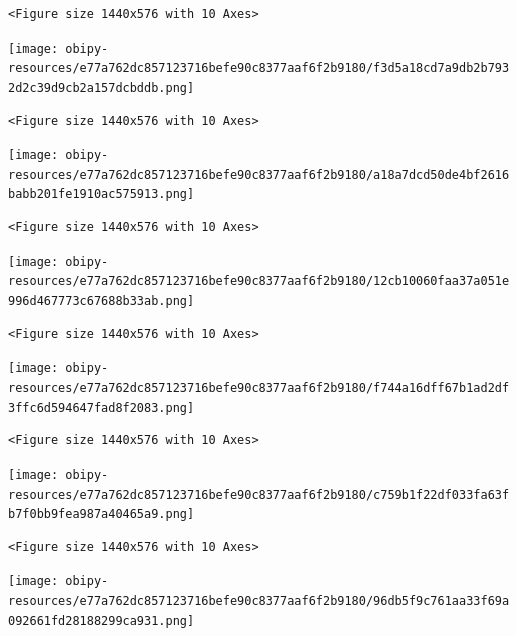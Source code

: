 \documentclass[11pt]{article}
\begin{document}
\begin{verbatim}
<Figure size 1440x576 with 10 Axes>
\end{verbatim}


\begin{center}
\texttt{[image: obipy-resources/e77a762dc857123716befe90c8377aaf6f2b9180/f3d5a18cd7a9db2b7932d2c39d9cb2a157dcbddb.png]}
\end{center}

\begin{verbatim}
<Figure size 1440x576 with 10 Axes>
\end{verbatim}


\begin{center}
\texttt{[image: obipy-resources/e77a762dc857123716befe90c8377aaf6f2b9180/a18a7dcd50de4bf2616babb201fe1910ac575913.png]}
\end{center}

\begin{verbatim}
<Figure size 1440x576 with 10 Axes>
\end{verbatim}


\begin{center}
\texttt{[image: obipy-resources/e77a762dc857123716befe90c8377aaf6f2b9180/12cb10060faa37a051e996d467773c67688b33ab.png]}
\end{center}

\begin{verbatim}
<Figure size 1440x576 with 10 Axes>
\end{verbatim}


\begin{center}
\texttt{[image: obipy-resources/e77a762dc857123716befe90c8377aaf6f2b9180/f744a16dff67b1ad2df3ffc6d594647fad8f2083.png]}
\end{center}

\begin{verbatim}
<Figure size 1440x576 with 10 Axes>
\end{verbatim}


\begin{center}
\texttt{[image: obipy-resources/e77a762dc857123716befe90c8377aaf6f2b9180/c759b1f22df033fa63fb7f0bb9fea987a40465a9.png]}
\end{center}

\begin{verbatim}
<Figure size 1440x576 with 10 Axes>
\end{verbatim}


\begin{center}
\texttt{[image: obipy-resources/e77a762dc857123716befe90c8377aaf6f2b9180/96db5f9c761aa33f69a092661fd28188299ca931.png]}
\end{center}
\end{document}
